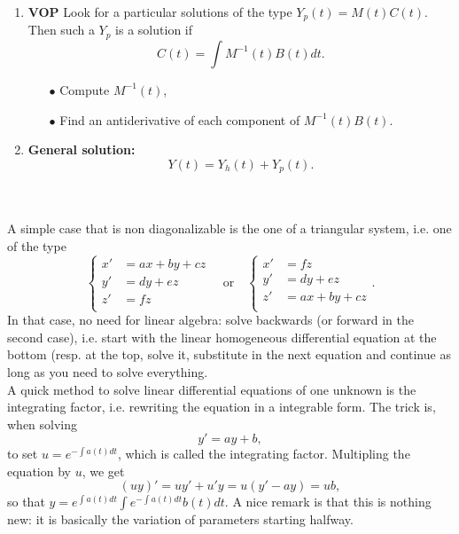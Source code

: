 \begin{itemize}
{\begin{minipage}{0.9\textwidth}
\begin{enumerate}
\item \textbf{VOP} Look for a particular solutions of the type $Y_p(t) = M(t)C(t)$. Then such a $Y_p$ is a solution if \[C(t) = \int M^{-1}(t) B(t)dt.\]
	\begin{itemize}
	\item[$\bullet$] Compute $M^{-1}(t)$,
	\item[$\bullet$] Find an antiderivative of each component of $M^{-1}(t)B(t)$. \end{itemize}

\item \textbf{General solution:} \[Y(t) = Y_h(t)+ Y_p(t).\]

\end{enumerate}  
\end{minipage}}\\
\\ 
 
A simple case that is non diagonalizable is the one of a triangular system, i.e. one of the type
\[\left\{\begin{split}
x' & = ax +by+ c z\\
y' & = dy + ez\\
z' & = fz\\
\end{split}\right.
\quad \text{or} \quad 
\left\{\begin{split}
x' & = fz\\
y' & = dy + ez\\
z' & = ax +by+ c z\\
\end{split}\right. .
\]
In that case, no need for linear algebra: solve backwards (or forward in the second case), i.e. start with the linear homogeneous differential equation at the bottom (resp. at the top, solve it, substitute in the next equation and continue as long as you need to solve everything.\\

A quick method to solve linear differential equations of one unknown is the integrating factor, i.e. rewriting the equation in a integrable form. The trick is, when solving 
\[ y' = ay + b,\]
to set $u = e^{-\int a(t)dt }$, which is called the integrating factor. Multipling the equation by $u$, we get
\[(uy)' = uy' + u' y = u (y' - a y ) = ub,\]
so that $y = e^{\int a(t)dt} \int e^{-\int a(t)dt}b(t)dt$. A nice remark is that this is nothing new: it is basically the variation of parameters starting halfway. \\


\end{itemize}
